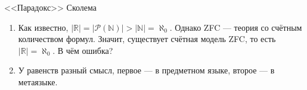 \documentclass[aspectratio=169]{beamer}
\begin{document}
\begin{frame}{<<Парадокс>> Сколема}
\begin{enumerate}
\item Как известно, $|\mathbb{R}| = |\mathcal{P}(\mathbb{N})| > |\mathbb{N}| = \aleph_0$. \pause Однако ZFC --- теория со счётным
количеством формул. \pause
Значит, существует счётная модель ZFC, то есть $|\mathbb{R}| = \aleph_0$. \pause В чём ошибка? \pause
\item У равенств разный смысл, первое --- в предметном языке, второе --- в метаязыке. 
\end{enumerate}
\end{frame}
\end{document}
